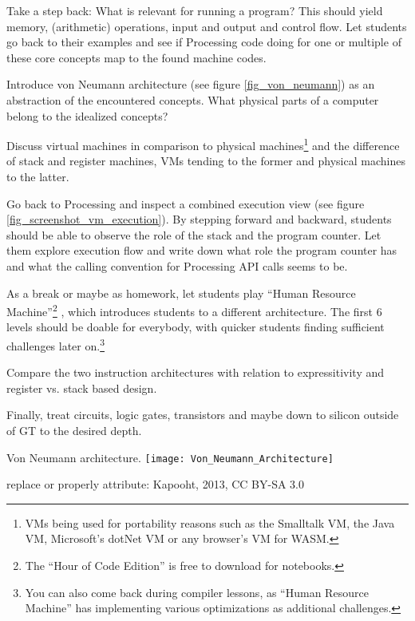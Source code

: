 \begin{instructions}
\item Take a step back: What is relevant for running a program? This should yield memory, (arithmetic) operations, input and output and control flow. Let students go back to their examples and see if Processing code doing for one or multiple of these core concepts map to the found machine codes.
\item Introduce von Neumann architecture (see figure \ref{fig_von_neumann}) as an abstraction of the encountered concepts. What physical parts of a computer belong to the idealized concepts?
\item Discuss virtual machines in comparison to physical machines\footnote{\acp{VM} being used for portability reasons such as the Smalltalk \ac{VM}, the Java \ac{VM}, Microsoft's dotNet \ac{VM} or any browser's \ac{VM} for WASM.} and the difference of stack and register machines, \acp{VM} tending to the former and physical machines to the latter.
\item Go back to Processing and inspect a combined execution view (see figure \ref{fig_screenshot_vm_execution}). By stepping forward and backward, students should be able to observe the role of the stack and the program counter. Let them explore execution flow and write down what role the program counter has and what the calling convention for Processing \ac{API} calls seems to be.
\item As a break or maybe as homework, let students play ``Human Resource Machine''\footnote{The ``Hour of Code Edition'' is free to download for notebooks.} \cite{Tom15}, which introduces students to a different architecture. The first 6 levels should be doable for everybody, with quicker students finding sufficient challenges later on.\footnote{You can also come back during compiler lessons, as ``Human Resource Machine'' has implementing various optimizations as additional challenges.}
\item Compare the two instruction architectures with relation to expressitivity and register vs. stack based design.

\item Finally, treat circuits, logic gates, transistors and maybe down to silicon outside of \ac{GT} to the desired depth.
\end{instructions}

\begin{cfigure}{Von Neumann architecture.}
\texttt{[image: Von\_Neumann\_Architecture]}
\begin{todo}
\item replace or properly attribute: Kapooht, 2013, CC BY-SA 3.0
\end{todo}
\end{cfigure}

